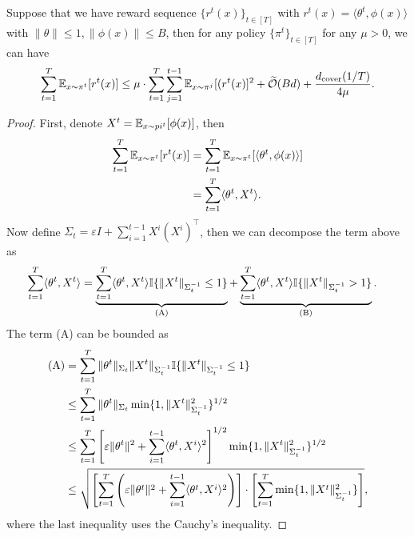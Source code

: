 \begin{lemma}\label{lemma:linearstructure}
    Suppose that we have reward sequence $\{r^t(x)\}_{t \in [T]}$ with $r^t(x) = \langle \theta^t, \phi(x)\rangle$ with $\|\theta\| \le 1, \|\phi(x) \|\le B$, then for any policy $\{\pi^t\}_{t \in [T]}$ for any $\mu>0$, we can have 
    \begin{align*}
        \sum_{t=1}^T \mathbb{E}_{x \sim \pi^t}[r^t(x)] \le \mu \cdot \sum_{t=1}^T\sum_{j=1}^{t-1} \mathbb{E}_{x\sim \pi^j}[(r^t(x)]^2 + \widetilde{\mathcal{O}}(Bd) +  \frac{d_{\mathrm{cover}}(1/T)}{4\mu}.
    \end{align*}
\end{lemma}
\begin{proof}
First, denote $X^t = \mathbb{E}_{x\sim pi^t}[\phi(x)]$, then
    \begin{align*}
        \sum_{t=1}^T \mathbb{E}_{x\sim \pi^t}[r^t(x)]&= \sum_{t=1}^T \mathbb{E}_{x\sim \pi^t}[\langle \theta^t, \phi(x) \rangle]\\
        &=\sum_{t=1}^T \langle \theta^t, X^t\rangle.
    \end{align*}
   Now define $\Sigma_t = \varepsilon I + \sum_{i=1}^{t-1}X^i (X^i)^\top$, then we can decompose the term above as 
    \begin{align*}
        \sum_{t=1}^T \langle \theta^t, X^t\rangle &= \underbrace{\sum_{t=1}^T \langle \theta^t, X^t\rangle \mathbb{I}\{\|X^t\|_{\Sigma_t^{-1}}\le 1\}}_{\textrm{(A)}} + \underbrace{\sum_{t=1}^T \langle \theta^t, X^t\rangle \mathbb{I}\{\|X^t\|_{\Sigma_t^{-1}}> 1\}}_{\textrm{(B)}}.
    \end{align*}
The term (A) can be bounded as 
\begin{align*}
    \textrm{(A)}&= \sum_{t=1}^T \|\theta^t\|_{\Sigma_t} \|X^t\|_{\Sigma_{t}^{-1}} \mathbb{I}\{\|X^t\|_{\Sigma_t^{-1}}\le  1\}\\
    &\le\sum_{t=1}^T\|\theta^t\|_{\Sigma_t} \min\{1, \|X^t\|_{\Sigma_t^{-1}}^2\}^{1/2}\\
    &\le \sum_{t=1}^T \left[\varepsilon\|\theta^t\|^2 + \sum_{i=1}^{t-1}\langle \theta^t, X^i\rangle ^2\right]^{1/2}\min\{1, \|X^t\|_{\Sigma_t^{-1}}^2\}^{1/2}\\
    &\le \sqrt{\left[\sum_{t=1}^T\left(\varepsilon\|\theta^t\|^2 + \sum_{i=1}^{t-1}\langle \theta^t, X^i\rangle ^2\right)\right]\cdot \left[\sum_{t=1}^T  \min\{1,\|X^t\|_{\Sigma_t^{-1}}^2\}\right]},
\end{align*}
where the last inequality uses the Cauchy's inequality.


\end{proof}
